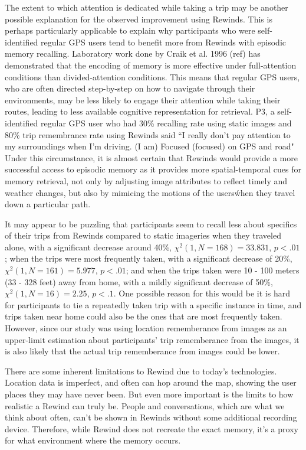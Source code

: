\documentclass{sigchi}
\begin{document}
The extent to which attention is dedicated while taking a trip may be another possible explanation for the observed improvement using Rewinds. This is perhaps particularly applicable to explain why participants who were self-identified regular GPS users tend to benefit more from Rewinds with episodic memory recalling. Laboratory work done by Craik et al. 1996 (ref) has demonstrated that the encoding of memory is more effective under full-attention conditions than divided-attention conditions.  This means that regular GPS users, who are often directed step-by-step on how to navigate through their environments, may be less likely to engage their attention while taking their routes, leading to less available cognitive representation for retrieval. P3, a self-identified regular GPS user who had 30\% recalling rate using static images and 80\% trip remembrance rate using Rewinds said ``I really don't pay attention to my surroundings when I'm driving. (I am) Focused (focused) on GPS and road"  Under this circumstance, it is almost certain that Rewinds would provide a more successful access to episodic memory as it provides more spatial-temporal cues for memory retrieval, not only by adjusting image attributes to reflect timely and weather changes, but also by mimicing the motions of the users\' when they travel down a particular path. 

It may appear to be puzzling that participants seem to recall less about specifics of their trips from Rewinds compared to static imageries when they traveled alone, with a significant decrease around 40\%, $\chi^2(1, N=168) = 33.831$, $p <.01$; when the trips were most frequently taken, with a significant decrease of 20\%, $\chi^2(1, N=161) = 5.977$, $p <.01$; and when the trips taken were 10 - 100 meters (33 - 328 feet) away from home, with a mildly significant decrease of 50\%, $\chi^2(1, N=16) = 2.25$, $p <.1$. One possible reason for this would be it is hard for participants to tie a repeatedly taken trip with a specific instance in time, and trips taken near home could also be the ones that are most frequently taken. However, since our study was using location rememberance from images as an upper-limit estimation about participants' trip rememberance from the images, it is also likely that the actual trip rememberance from images could be lower. 


There are some inherent limitations to Rewind due to today's technologies. Location data is imperfect, and often can hop around the map, showing the user places they may have never been. But even more important is the limits to how realistic a Rewind can truly be. People and conversations, which are what we think about often, can't be shown in Rewinds without some additional recording device. Therefore, while Rewind does not recreate the exact memory, it's a proxy for what environment where the memory occurs.
\end{document}
